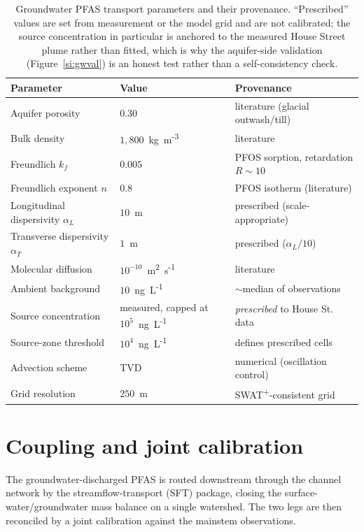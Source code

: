 \documentclass[12pt]{article}
\begin{document}
\begin{table}[ht]\centering
\caption{Groundwater PFAS transport parameters and their provenance. ``Prescribed'' values are set
from measurement or the model grid and are not calibrated; the source concentration in particular is
anchored to the measured House Street plume rather than fitted, which is why the aquifer-side
validation (Figure~\ref{si:gwval}) is an honest test rather than a self-consistency check.}
\label{si:gwparams}
\begin{tabularx}{\textwidth}{lYl}
\hline
Parameter & Value & Provenance \\
\hline
Aquifer porosity & $0.30$ & literature (glacial outwash/till) \\
Bulk density & $1{,}800$~kg~m\textsuperscript{-3} & literature \\
Freundlich $k_f$ & $0.005$ & PFOS sorption, retardation $R\!\sim\!10$ \\
Freundlich exponent $n$ & $0.8$ & PFOS isotherm (literature) \\
Longitudinal dispersivity $\alpha_L$ & $10$~m & prescribed (scale-appropriate) \\
Transverse dispersivity $\alpha_T$ & $1$~m & prescribed ($\alpha_L/10$) \\
Molecular diffusion & $10^{-10}$~m\textsuperscript{2}~s\textsuperscript{-1} & literature \\
Ambient background & $10$~ng~L\textsuperscript{-1} & $\sim$median of observations \\
Source concentration & measured, capped at $10^5$~ng~L\textsuperscript{-1} & \emph{prescribed} to House St. data \\
Source-zone threshold & $10^4$~ng~L\textsuperscript{-1} & defines prescribed cells \\
Advection scheme & TVD & numerical (oscillation control) \\
Grid resolution & $250$~m & SWAT\textsuperscript{+}-consistent grid \\
\hline
\end{tabularx}
\end{table}

\section{Coupling and joint calibration}\label{si:couple}

The groundwater-discharged PFAS is routed downstream through the channel network by the
streamflow-transport (SFT) package, closing the surface-water/groundwater mass balance on a single
watershed. The two legs are then reconciled by a joint calibration against the mainstem observations.
\end{document}
